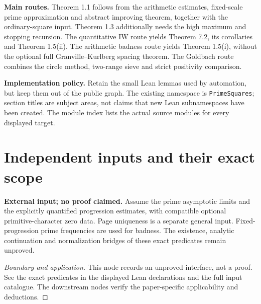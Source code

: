 \textbf{Main routes.}
Theorem 1.1 follows from the arithmetic estimates, fixed-scale prime
approximation and abstract improving theorem, together with the ordinary-square
input. Theorem 1.3 additionally needs the high maximum and stopping recursion.
The quantitative IW route yields Theorem 7.2, its corollaries and Theorem 1.5(ii).
The arithmetic badness route yields Theorem 1.5(i), without the optional full
Granville--Kurlberg spacing theorem. The Goldbach route combines the circle
method, two-range sieve and strict positivity comparison.

\textbf{Implementation policy.}
Retain the small Lean lemmas used by automation, but keep them out of the
public graph. The existing namespace is \texttt{PrimeSquares}; section titles
are subject areas, not claims that new Lean subnamespaces have been created.
The module index lists the actual source modules for every displayed target.

\section{Independent inputs and their exact scope}

\begin{lemma}
\label{input_prime_distribution}
\uses{}
\textbf{External input; no proof claimed.} Assume the prime asymptotic limits and the explicitly quantified progression estimates, with compatible optional primitive-character zero data. Page uniqueness is a separate general input. Fixed-progression prime frequencies are used for badness. The existence, analytic continuation and normalization bridges of these exact predicates remain unproved.
\end{lemma}
\begin{proof}[Boundary and application]
\uses{}
This node records an unproved interface, not a proof. See the exact predicates in the displayed Lean declarations and the full input catalogue. The downstream nodes verify the paper-specific applicability and deductions.
\end{proof}

